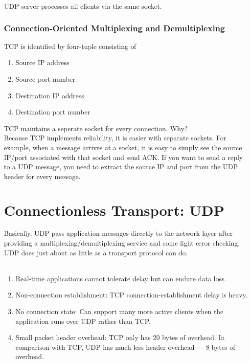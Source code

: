 UDP server processes all clients via the same socket.

\subsubsection{Connection-Oriented Multiplexing and Demultiplexing}

\hf TCP is identified by four-tuple consisting of
\begin{enumerate}
	\item Source IP address
	\item Source port number
	\item Destination IP address
	\item Destination port number
\end{enumerate}


TCP maintains a seperate socket for every connection. Why?\\

Because TCP implements reliability, it
is easier with separate sockets. For example, when a message arrives
at a socket, it is easy to simply see the source IP/port associated
with that socket and send ACK. If you want to send a reply to a UDP
message, you need to extract the source IP and port from the UDP
header for every message.\\


\section{Connectionless Transport: UDP}

\hf Basically, UDP pass application messages directly to the network layer after providing a multiplexing/demultiplexing service and some light error checking. UDP does just about as little as a transport protocol can do.\\

\\

\begin{enumerate}
	\item Real-time applications cannot tolerate delay but can endure data loss.
	\item Non-connection establishment: TCP connection-establishment delay is heavy.
	\item No connection state: Can support many more active clients when the application runs over UDP rather than TCP.
	\item Small packet header overhead: TCP only has 20 bytes of overhead. In comparison with TCP, UDP has much less header overhead --- 8 bytes of overhead.
\end{enumerate}

